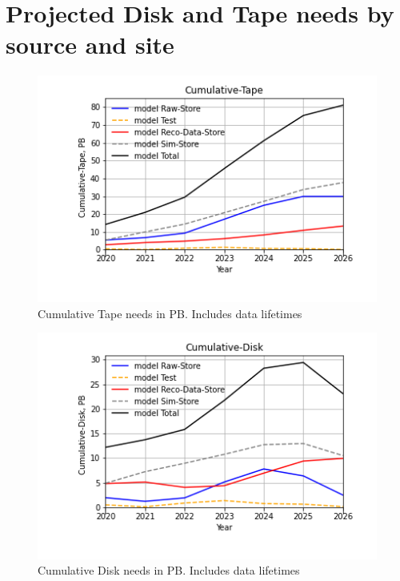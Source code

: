 \section{Projected Disk and Tape needs by source and site}
\begin{figure}[h]
\centering\includegraphics[height=0.4\textwidth]{Parameters_2022-11-21-2026/Parameters_2022-11-21-2026-Cumulative-Tape.png}
\caption{Cumulative Tape needs in PB. Includes data lifetimes}
\label{fig:Cumulative-Tape}
\end{figure}
\begin{figure}[h]
\centering\includegraphics[height=0.4\textwidth]{Parameters_2022-11-21-2026/Parameters_2022-11-21-2026-Cumulative-Disk.png}
\caption{Cumulative Disk needs in PB. Includes data lifetimes}
\label{fig:Cumulative-Disk}
\end{figure}

